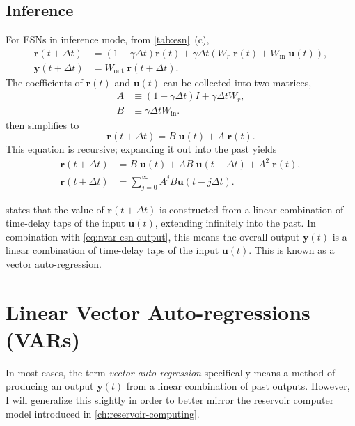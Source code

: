 \subsection{Inference}

For ESNs in inference mode, from \cref{tab:esn}~(c),
\begin{align}
  \bm{r}(t + \Delta t) &= (1 - \gamma \Delta t) \bm{r}(t) + \gamma \Delta t \left( W_r\;\bm{r}(t) + W_\text{in}\;\bm{u}(t) \right), \label{eq:nvar-esn} \\
  \bm{y}(t+\Delta t) &= W_\text{out}\;\bm{r}(t+\Delta t). \label{eq:nvar-esn-output}
\end{align}
The coefficients of $\bm{r}(t)$ and $\bm{u}(t)$ can be collected into two matrices,
\begin{align}
  A &\equiv (1 - \gamma \Delta t) I + \gamma \Delta t W_r, \\
  B &\equiv \gamma \Delta t W_\text{in}.
\end{align}
 then simplifies to
\begin{equation}
  \bm{r}(t + \Delta t) = B\;\bm{u}(t) + A\;\bm{r}(t).
\end{equation}
This equation is recursive; expanding it out into the past yields
\begin{align}
  \bm{r}(t + \Delta t) &= B\;\bm{u}(t) + AB\;\bm{u}(t - \Delta t) + A^2\;\bm{r}(t), \\
  \bm{r}(t + \Delta t) &= \sum_{j = 0}^\infty A^j B \bm{u}(t - j \Delta t). \label{eq:esn-var-mat}
\end{align}

 states that the value of $\bm{r}(t + \Delta t)$
is constructed from a linear combination of time-delay taps of the
input $\bm{u}(t)$, extending infinitely into the past.  In combination
with \cref{eq:nvar-esn-output}, this means the overall output
$\bm{y}(t)$ is a linear combination of time-delay taps of the input
$\bm{u}(t)$.  This is known as a vector auto-regression.

\section{Linear Vector Auto-regressions (VARs)}

In most cases, the term \emph{vector auto-regression} specifically
means a method of producing an output $\bm{y}(t)$ from a linear
combination of past outputs. However, I will generalize this slightly
in order to better mirror the reservoir computer model introduced in
\cref{ch:reservoir-computing}.

